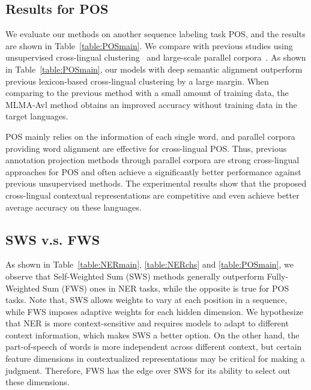 \documentclass[11pt,a4paper]{article}
\begin{document}
	\subsection{Results for POS}
	We evaluate our methods on another sequence labeling task POS, and the results are shown in Table~\ref{table:POSmain}. We compare with previous studies using unsupervised cross-lingual clustering~\cite{fang2017model} and large-scale parallel corpora~\cite{das2011unsupervised}. As shown in Table~\ref{table:POSmain}, our models with deep semantic alignment outperform previous lexicon-based cross-lingual clustering by a large margin. When comparing to the previous method with a small amount of training data, the MLMA-Avl method obtains an improved accuracy without training data in the target languages.
	
	POS mainly relies on the information of each single word, and parallel corpora providing word alignment are effective for cross-lingual POS. Thus, previous annotation projection methods through parallel corpora are strong cross-lingual approaches for POS and often achieve a significantly better performance against previous unsupervised methods. The experimental results show that the proposed cross-lingual contextual representations are competitive and even achieve better average accuracy on these languages.
	
	\subsection{SWS v.s. FWS}
	As shown in Table~\ref{table:NERmain}, \ref{table:NERchs} and \ref{table:POSmain}, we observe that Self-Weighted Sum (SWS) methods generally outperform Fully-Weighted Sum (FWS) ones in NER tasks, while the opposite is true for POS tasks. Note that, SWS allows weights to vary at each position in a sequence, while FWS imposes adaptive weights for each hidden dimension. We hypothesize that NER is more context-sensitive and requires models to adapt to different context information, which makes SWS a better option. On the other hand, the part-of-speech of words is more independent across different context, but certain feature dimensions in contextualized representations may be critical for making a judgment. Therefore, FWS has the edge over SWS for its ability to select out these dimensions.
	
\end{document}
